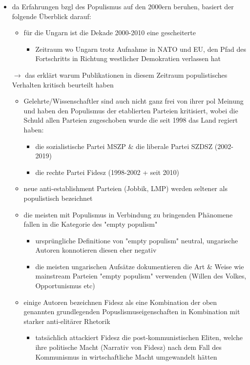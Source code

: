 \documentclass[11pt]{article}
\begin{document}
\begin{itemize}
\item da Erfahrungen bzgl des Populismus auf den 2000ern beruhen, basiert der folgende Überblick darauf:
\begin{itemize}
\item für die Ungarn ist die Dekade 2000-2010 eine gescheiterte
\begin{itemize}
\item Zeitraum wo Ungarn trotz Aufnahme in NATO und EU, den Pfad des Fortschritts in Richtung westlicher Demokratien verlassen hat
\end{itemize}
\end{itemize}
\(\rightarrow\) das erklärt warum Publikationen in diesem Zeitraum populistisches Verhalten kritisch beurteilt haben
\begin{itemize}
\item Gelehrte/Wissenschaftler sind auch nicht ganz frei von ihrer pol Meinung und haben den Populismus der etablierten Parteien kritisiert, wobei die Schuld allen Parteien zugeschoben wurde die seit 1998 das Land regiert haben:
\begin{itemize}
\item die sozialistische Partei MSZP \& die liberale Partei SZDSZ (2002-2019)
\item die rechte Partei Fidesz (1998-2002 + seit 2010)
\end{itemize}
\item neue anti-establishment Parteien (Jobbik, LMP) werden seltener als populistisch bezeichnet
\item die meisten mit Populismus in Verbindung zu bringenden Phänomene fallen in die Kategorie des "empty populism"
\begin{itemize}
\item ursprüngliche Definitione von "empty populism" neutral, ungarische Autoren konnotieren diesen eher negativ
\item die meisten ungarischen Aufsätze dokumentieren die Art \& Weise wie mainstream Parteien "empty populism" verwenden (Willen des Volkes, Opportunismus etc)
\end{itemize}
\item einige Autoren bezeichnen Fidesz als eine Kombination der oben genannten grundlegenden Popuslismuseigenschaften in Kombination mit starker anti-elitärer Rhetorik
\begin{itemize}
\item tatsächlich attackiert Fidesz die post-kommunistischen Eliten, welche ihre politische Macht (Narrativ von Fidesz) nach dem Fall des Kommunismus in wirtschaftliche Macht umgewandelt hätten

\end{itemize}
\end{itemize}
\end{itemize}
\end{document}
